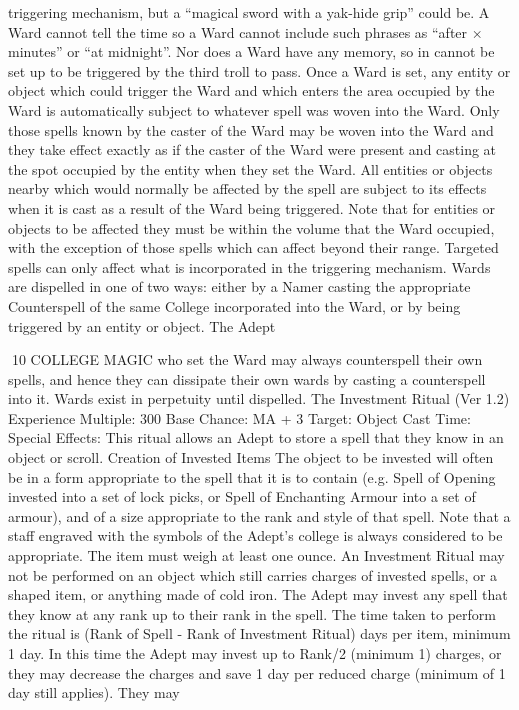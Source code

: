 \documentclass[a4paper]{article}
\begin{document}
\begin{multicols}{3}
triggering mechanism, but a “magical sword with a
yak-hide grip” could be. A Ward cannot tell the
time so a Ward cannot include such phrases as
“after × minutes” or “at midnight”. Nor does a
Ward have any memory, so in cannot be set up to
be triggered by the third troll to pass.
Once a Ward is set, any entity or object which
could trigger the Ward and which enters the area
occupied by the Ward is automatically subject to
whatever spell was woven into the Ward. Only
those spells known by the caster of the Ward may
be woven into the Ward and they take effect exactly as if the caster of the Ward were present and
casting at the spot occupied by the entity when
they set the Ward. All entities or objects nearby
which would normally be affected by the spell are
subject to its effects when it is cast as a result of
the Ward being triggered. Note that for entities or
objects to be affected they must be within the volume that the Ward occupied, with the exception of
those spells which can affect beyond their range.
Targeted spells can only affect what is incorporated in the triggering mechanism.
Wards are dispelled in one of two ways: either by a
Namer casting the appropriate Counterspell of the
same College incorporated into the Ward, or by
being triggered by an entity or object. The Adept

10 COLLEGE MAGIC
who set the Ward may always counterspell their
own spells, and hence they can dissipate their own
wards by casting a counterspell into it. Wards exist
in perpetuity until dispelled.
The Investment Ritual (Ver 1.2)
Experience Multiple: 300
Base Chance: MA + 3%
Target: Object
Cast Time: Special
Effects: This ritual allows an Adept to store a spell
that they know in an object or scroll.
Creation of Invested Items The object to be invested will often be in a form appropriate to the
spell that it is to contain (e.g. Spell of Opening
invested into a set of lock picks, or Spell of Enchanting Armour into a set of armour), and of a
size appropriate to the rank and style of that spell.
Note that a staff engraved with the symbols of the
Adept’s college is always considered to be appropriate. The item must weigh at least one ounce.
An Investment Ritual may not be performed on an
object which still carries charges of invested spells,
or a shaped item, or anything made of cold iron.
The Adept may invest any spell that they know at
any rank up to their rank in the spell. The time
taken to perform the ritual is (Rank of Spell - Rank
of Investment Ritual) days per item, minimum 1
day. In this time the Adept may invest up to
Rank/2 (minimum 1) charges, or they may decrease the charges and save 1 day per reduced
charge (minimum of 1 day still applies). They may


\end{multicols}
\end{document}
